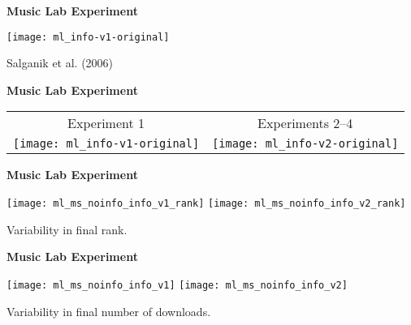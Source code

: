   \textbf{Music Lab Experiment}

    \texttt{[image: ml\_info-v1-original]}

    Salganik et al. (2006)
    \cite{salganik2006a}


  \textbf{Music Lab Experiment}

  \begin{tabular}{cc}
    Experiment 1 & Experiments 2--4 \\
    \texttt{[image: ml\_info-v1-original]} & 
    \texttt{[image: ml\_info-v2-original]} \\
  \end{tabular}





  \textbf{Music Lab Experiment}

  \texttt{[image: ml\_ms\_noinfo\_info\_v1\_rank]}
  \texttt{[image: ml\_ms\_noinfo\_info\_v2\_rank]}
  
  
   
    Variability in final rank.
  


  \textbf{Music Lab Experiment}

  \texttt{[image: ml\_ms\_noinfo\_info\_v1]}
  \texttt{[image: ml\_ms\_noinfo\_info\_v2]}
  
  
   
    Variability in final number of downloads.
  
  






